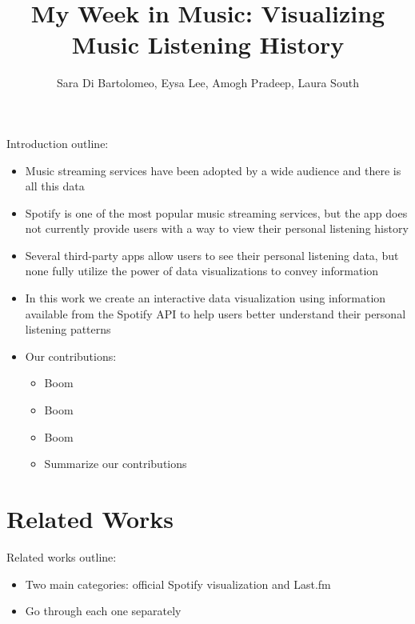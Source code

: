 \documentclass[journal]{vgtc}                %
\title{My Week in Music: Visualizing Music Listening History}
\author{Sara Di Bartolomeo, Eysa Lee, Amogh Pradeep, Laura South}
\begin{document}


\maketitle

Introduction outline:
\begin{itemize}
  \item Music streaming services have been adopted by a wide audience and there is all this data

  \item Spotify is one of the most popular music streaming services, but the app does not currently provide users with a way to view their personal listening history
  
  \item Several third-party apps allow users to see their personal listening data, but none fully utilize the power of data visualizations to convey information

  \item In this work we create an interactive data visualization using information available from the Spotify API to help users better understand their personal listening patterns
  
  \item Our contributions:
  \begin{itemize}
    \item Boom
    \item Boom
    \item Boom
    \item Summarize our contributions
  \end{itemize}
\end{itemize}

\section{Related Works}
Related works outline:
\begin{itemize}
  \item Two main categories: official Spotify visualization and Last.fm
  \item Go through each one separately
\end{itemize}
\end{document}
